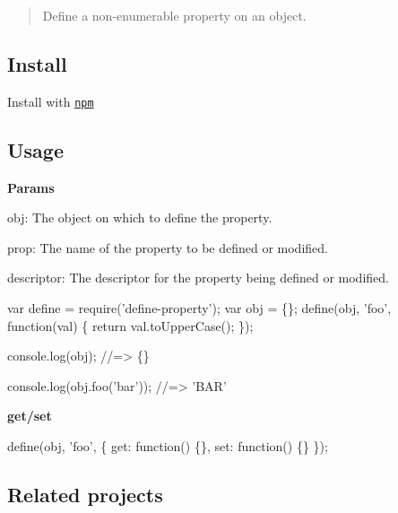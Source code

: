\begin{quote}
Define a non-\/enumerable property on an object. \end{quote}


\subsection*{Install}

Install with \href{https://www.npmjs.com/}{\tt npm}




\subsection*{Usage}

{\bfseries Params}


\begin{DoxyItemize}
\item {\ttfamily obj}\+: The object on which to define the property.
\item {\ttfamily prop}\+: The name of the property to be defined or modified.
\item {\ttfamily descriptor}\+: The descriptor for the property being defined or modified.
\end{DoxyItemize}


\begin{DoxyCode}
var define = require('define-property');
var obj = \{\};
define(obj, 'foo', function(val) \{
  return val.toUpperCase();
\});

console.log(obj);
//=> \{\}

console.log(obj.foo('bar'));
//=> 'BAR'
\end{DoxyCode}


{\bfseries get/set}


\begin{DoxyCode}
define(obj, 'foo', \{
  get: function() \{\},
  set: function() \{\}
\});
\end{DoxyCode}


\subsection*{Related projects}


